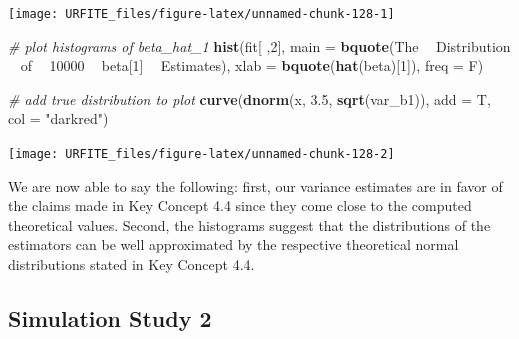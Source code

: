 \documentclass[]{book}
\newenvironment{Shaded}{\begin{snugshade}}{\end{snugshade}}
\newcommand{\KeywordTok}[1]{\textcolor[rgb]{0.13,0.29,0.53}{\textbf{#1}}}
\newcommand{\DataTypeTok}[1]{\textcolor[rgb]{0.13,0.29,0.53}{#1}}
\newcommand{\DecValTok}[1]{\textcolor[rgb]{0.00,0.00,0.81}{#1}}
\newcommand{\FloatTok}[1]{\textcolor[rgb]{0.00,0.00,0.81}{#1}}
\newcommand{\StringTok}[1]{\textcolor[rgb]{0.31,0.60,0.02}{#1}}
\newcommand{\CommentTok}[1]{\textcolor[rgb]{0.56,0.35,0.01}{\textit{#1}}}
\newcommand{\OperatorTok}[1]{\textcolor[rgb]{0.81,0.36,0.00}{\textbf{#1}}}
\newcommand{\NormalTok}[1]{#1}
\theoremstyle{definition}
\theoremstyle{definition}
\theoremstyle{definition}
\theoremstyle{remark}
\begin{document}
\begin{center}\texttt{[image: URFITE\_files/figure-latex/unnamed-chunk-128-1]} \end{center}

\begin{Shaded}
\begin{Highlighting}[]
\CommentTok{# plot histograms of beta_hat_1 }
\KeywordTok{hist}\NormalTok{(fit[ ,}\DecValTok{2}\NormalTok{], }
     \DataTypeTok{main =} \KeywordTok{bquote}\NormalTok{(The }\OperatorTok{~}\StringTok{ }\NormalTok{Distribution  }\OperatorTok{~}\StringTok{ }\NormalTok{of }\OperatorTok{~}\StringTok{ }\DecValTok{10000} \OperatorTok{~}\StringTok{ }\NormalTok{beta[}\DecValTok{1}\NormalTok{] }\OperatorTok{~}\StringTok{ }\NormalTok{Estimates), }
     \DataTypeTok{xlab =} \KeywordTok{bquote}\NormalTok{(}\KeywordTok{hat}\NormalTok{(beta)[}\DecValTok{1}\NormalTok{]), }
     \DataTypeTok{freq =}\NormalTok{ F)}

\CommentTok{# add true distribution to plot}
\KeywordTok{curve}\NormalTok{(}\KeywordTok{dnorm}\NormalTok{(x, }\FloatTok{3.5}\NormalTok{, }\KeywordTok{sqrt}\NormalTok{(var_b1)), }\DataTypeTok{add =}\NormalTok{ T, }\DataTypeTok{col =} \StringTok{"darkred"}\NormalTok{)}
\end{Highlighting}
\end{Shaded}

\begin{center}\texttt{[image: URFITE\_files/figure-latex/unnamed-chunk-128-2]} \end{center}

We are now able to say the following: first, our variance estimates are
in favor of the claims made in Key Concept 4.4 since they come close to
the computed theoretical values. Second, the histograms suggest that the
distributions of the estimators can be well approximated by the
respective theoretical normal distributions stated in Key Concept 4.4.

\subsection*{Simulation Study 2}\label{simulation-study-2}
\end{document}
